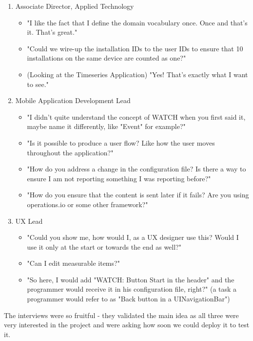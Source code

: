 \begin{enumerate}
		\item Associate Director, Applied Technology
		\begin{itemize}
				\item[] "I like the fact that I define the domain vocabulary once. Once and that's it. That's great."
				\item[] "Could we wire-up the installation IDs to the user IDs to ensure that 10 installations on the same device are counted as one?"
				\item[] (Looking at the Timeseries Application) "Yes! That's exactly what I want to see."
		\end{itemize}			
		
		\item Mobile Application Development Lead
		\begin{itemize}
				\item[] "I didn't quite understand the concept of WATCH when you first said it, maybe name it differently, like "Event" for example?"
				\item[] "Is it possible to produce a user flow? Like how the user moves throughout the application?"
				\item[] "How do you address a change in the configuration file? Is there a way to ensure I am not reporting something I was reporting before?"
				\item[] "How do you ensure that the content is sent later if it fails? Are you using operations.io or some other framework?"
		\end{itemize}
		
		\item UX Lead
		\begin{itemize}
				\item[] "Could you show me, how would I, as a UX designer use this? Would I use it only at the start or towards the end as well?"
				\item[] "Can I edit measurable items?"
				\item[] "So here, I would add "WATCH: Button Start in the header" and the programmer would receive it in his configuration file, right?" (a task a programmer would refer to as "Back button in a UINavigationBar")
		\end{itemize}
\end{enumerate}

The interviews were so fruitful - they validated the main idea as all three were very interested in the project and were asking how soon we could deploy it to test it. 


